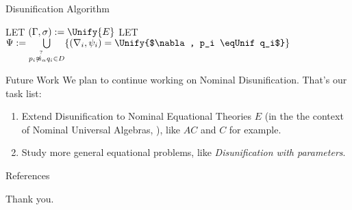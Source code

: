 \documentclass{beamer}
\begin{document}
    \begin{frame}{Disunification Algorithm}
        \begin{algorithm}[H]


            LET $(\Gamma, \sigma) :=  \Unify{E}$ \;
            LET $\Psi := \bigcup\limits_{p_i \eqDis q_i \in D}  \{ (\nabla_i, \psi_i) = \Unify{$\nabla, p_i \eqUnif q_i$} \}$ \;

            \caption{Disunification Algorithm}
        \end{algorithm}
    \end{frame}

    \begin{frame}{Future Work}
        We plan to continue working on Nominal Disunification. That's our task list:
        \begin{enumerate}
            \item Extend Disunification to Nominal Equational Theories $E$ (in the the context of Nominal Universal Algebras, \cite{gabbay:nomuae}), like $AC$ and $C$ for example.
            \item Study more general equational problems, like \textit{Disunification with parameters}.
        \end{enumerate}
    \end{frame}

    \begin{frame}[allowframebreaks]{References}
        
        
    \end{frame}

    \begin{frame}[standout]
        Thank you.
    \end{frame}
\end{document}
